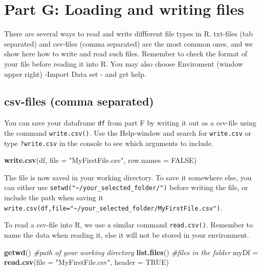 \documentclass[]{article}
\newenvironment{Shaded}{\begin{snugshade}}{\end{snugshade}}
\newcommand{\KeywordTok}[1]{\textcolor[rgb]{0.13,0.29,0.53}{\textbf{#1}}}
\newcommand{\DataTypeTok}[1]{\textcolor[rgb]{0.13,0.29,0.53}{#1}}
\newcommand{\StringTok}[1]{\textcolor[rgb]{0.31,0.60,0.02}{#1}}
\newcommand{\CommentTok}[1]{\textcolor[rgb]{0.56,0.35,0.01}{\textit{#1}}}
\newcommand{\OtherTok}[1]{\textcolor[rgb]{0.56,0.35,0.01}{#1}}
\newcommand{\NormalTok}[1]{#1}
\begin{document}
\section{Part G: Loading and writing
files}\label{part-g-loading-and-writing-files}

There are several ways to read and write diffferent file types in R.
txt-files (tab separated) and csv-files (comma separated) are the most
common ones, and we show here how to write and read such files. Remember
to check the format of your file before reading it into R. You may also
choose Enviroment (window upper right) -Import Data set - and get help.

\subsection{csv-files (comma
separated)}\label{csv-files-comma-separated}

You can save your dataframe \texttt{df} from part F by writing it out as
a csv-file using the command \texttt{write.csv()}. Use the Help-window
and search for \texttt{write.csv} or type \texttt{?write.csv} in the
console to see which arguments to include.

\begin{Shaded}
\begin{Highlighting}[]
\KeywordTok{write.csv}\NormalTok{(df, }\DataTypeTok{file =} \StringTok{"MyFirstFile.csv"}\NormalTok{, }\DataTypeTok{row.names =} \OtherTok{FALSE}\NormalTok{)}
\end{Highlighting}
\end{Shaded}

The file is now saved in your working directory. To save it somewhere
else, you can either use
\texttt{setwd("\textasciitilde{}/your\_selected\_folder/")} before
writing the file, or include the path when saving it
\texttt{write.csv(df,file="\textasciitilde{}/your\_selected\_folder/MyFirstFile.csv")}.

To read a csv-file into R, we use a similar command \texttt{read.csv()}.
Remember to name the data when reading it, else it will not be stored in
your environment.

\begin{Shaded}
\begin{Highlighting}[]
\KeywordTok{getwd}\NormalTok{()  }\CommentTok{#path of your working directory}
\KeywordTok{list.files}\NormalTok{()  }\CommentTok{#files in the folder }
\NormalTok{myDf =}\StringTok{ }\KeywordTok{read.csv}\NormalTok{(}\DataTypeTok{file =} \StringTok{"MyFirstFile.csv"}\NormalTok{, }\DataTypeTok{header =} \OtherTok{TRUE}\NormalTok{)}
\end{Highlighting}
\end{Shaded}
\end{document}
